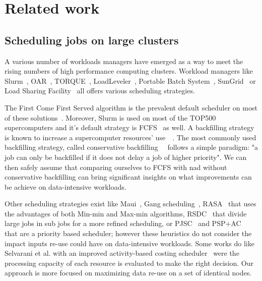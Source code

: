 \documentclass[conference,10pt]{IEEEtran}
\begin{document}
\section{Related work}\label{sec.related_work}

\subsection{Scheduling jobs on large clusters}

A various number of workloads managers have emerged 
as a way to meet the rising numbers of high performance computing clusters.
Workload managers like Slurm~\cite{SLURM}, OAR~\cite{oar},
TORQUE~\cite{torque}, LoadLeveler~\cite{loadleveler},
Portable Batch System~\cite{pbs}, SunGrid~\cite{sungrid}
or Load Sharing Facility~\cite{lsf} all offers 
various scheduling strategies.

The First Come First Served algorithm is the prevalent default
scheduler on most of these solutions~\cite{survey_workload_manager_and_scheduler}.
Moreover, Slurm is used on most of the TOP500 supercomputers and it's default strategy is FCFS~\cite{slurm_website_scheduling} as well.
A backfilling strategy is known to increase
a supercomputer resources' use~\cite{maui}~\cite{New_Backfill}. 
The most commonly used backfilling strategy, called conservative 
backfilling~\cite{Characterization_of_Backfilling}~\cite{Introducing-New-Backfill-based} follows
a simple paradigm: "a job can only be backfilled if it does not
delay a job of higher priority".
We can then safely assume that comparing ourselves to FCFS with nad without conservative backfilling can 
bring significant insights on what improvements can be achieve on data-intensive workloads.

Other scheduling strategies exist like 
Maui~\cite{Maui_Scheduler}, Gang scheduling~\cite{gang_scheduling}, 
RASA~\cite{rasa} that uses the advantages of both Min-min and Max-min algorithms,
RSDC~\cite{rsdc} that divide large jobs in sub jobs for a more refined scheduling,
or PJSC~\cite{pjsc} and PSP+AC~\cite{PSP_AC} that are a priority based scheduler; 
however these heuristics do not consider the impact
inputs re-use could have on data-intensive workloads.
Some works do like Selvarani et al. with an improved activity-based costing scheduler~\cite{Improved_cost_based_algorithm} 
were the processing capacity of each resource is evaluated to make the right decision.
Our approach is more focused on maximizing data re-use on a 
set of identical nodes.
\end{document}

